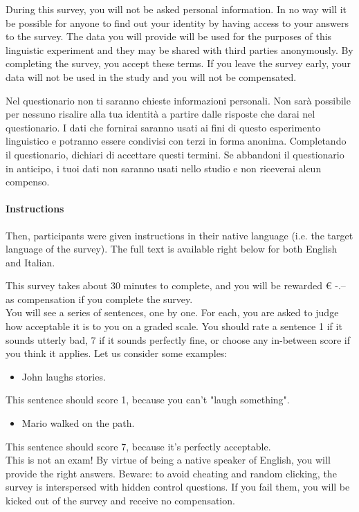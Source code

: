 \begin{kaobox}[frametitle=Privacy policy for the English survey]
During this survey, you will not be asked personal information. In no way will it be possible for anyone to find out your identity by having access to your answers to the survey. The data you will provide will be used for the purposes of this linguistic experiment and they may be shared with third parties anonymously. By completing the survey, you accept these terms. If you leave the survey early, your data will not be used in the study and you will not be compensated.
\end{kaobox}

\begin{kaobox}[frametitle=Privacy policy for the Italian survey]
Nel questionario non ti saranno chieste informazioni personali. Non sarà possibile per nessuno risalire alla tua identità a partire dalle risposte che darai nel questionario. I dati che fornirai saranno usati ai fini di questo esperimento linguistico e potranno essere condivisi con terzi in forma anonima. Completando il questionario, dichiari di accettare questi termini. Se abbandoni il questionario in anticipo, i tuoi dati non saranno usati nello studio e non riceverai alcun compenso.
\end{kaobox}

\paragraph{Instructions} Then, participants were given instructions in their native language (i.e. the target language of the survey). The full text is available right below for both English and Italian.

\begin{kaobox}[frametitle=Instructions for the English survey]
This survey takes about 30 minutes to complete, and you will be rewarded € -.-- as compensation if you complete the survey.\\
You will see a series of sentences, one by one. For each, you are asked to judge how acceptable it is to you on a graded scale. You should rate a sentence 1 if it sounds utterly bad, 7 if it sounds perfectly fine, or choose any in-between score if you think it applies. Let us consider some examples:
\begin{itemize}
    \item John laughs stories.
\end{itemize}
This sentence should score 1, because you can't "laugh something".
\begin{itemize}
    \item Mario walked on the path.
\end{itemize}
This sentence should score 7, because it's perfectly acceptable.\\
This is not an exam! By virtue of being a native speaker of English, you will provide the right answers. Beware: to avoid cheating and random clicking, the survey is interspersed with hidden control questions. If you fail them, you will be kicked out of the survey and receive no compensation.
\end{kaobox}

